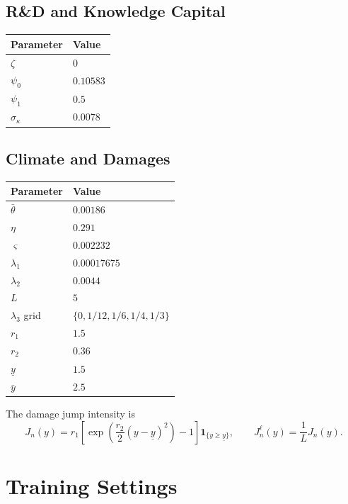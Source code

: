 \documentclass[11pt]{article}
\begin{document}
\subsection*{R\&D and Knowledge Capital}

\begin{center}
\begin{tabular}{ll}
\toprule
Parameter & Value \\
\midrule
$\zeta$ & $0$ \\
$\psi_0$ & $0.10583$ \\
$\psi_1$ & $0.5$ \\
$\sigma_\kappa$ & $0.0078$ \\
\bottomrule
\end{tabular}
\end{center}

\subsection*{Climate and Damages}

\begin{center}
\begin{tabular}{ll}
\toprule
Parameter & Value \\
\midrule
$\bar\theta$ & $0.00186$ \\
$\eta$ & $0.291$ \\
$\varsigma$ & $0.002232$ \\
$\lambda_1$ & $0.00017675$ \\
$\lambda_2$ & $0.0044$ \\
$L$ & $5$ \\
$\lambda_3$ grid & $\{0,1/12,1/6,1/4,1/3\}$ \\
$r_1$ & $1.5$ \\
$r_2$ & $0.36$ \\
$\underline y$ & $1.5$ \\
$\bar y$ & $2.5$ \\
\bottomrule
\end{tabular}
\end{center}

The damage jump intensity is
\[
J_n(y)=r_1\left[\exp\left(\frac{r_2}{2}(y-\underline y)^2\right)-1\right]
\mathbf{1}_{\{y\geq \underline y\}},
\qquad
J_n^\ell(y)=\frac{1}{L}J_n(y).
\]

\section{Training Settings}
\end{document}
